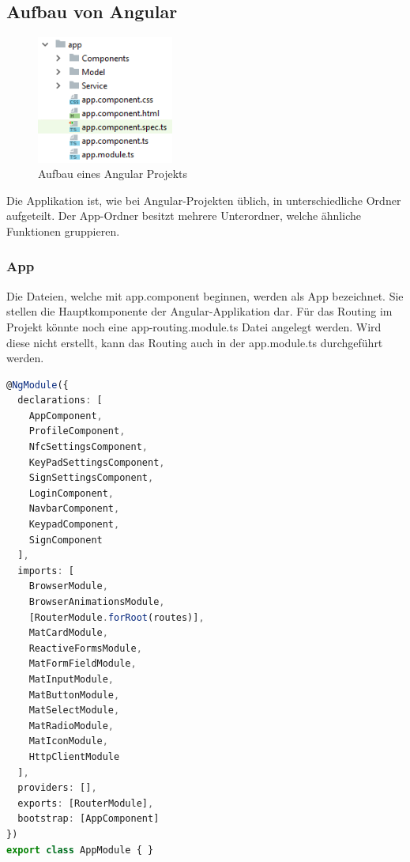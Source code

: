\subsection{Aufbau von Angular}

\begin{figure}[h]
    \centering
    \includegraphics[width=0.4\textwidth]{pics/Aufbau_Angular.png}
    \caption{Aufbau eines Angular Projekts}
    \end{figure}

Die Applikation ist, wie bei Angular-Projekten üblich, in unterschiedliche Ordner aufgeteilt. Der App-Ordner besitzt mehrere Unterordner, welche ähnliche Funktionen gruppieren.

\subsubsection{App}
Die Dateien, welche mit app.component beginnen, werden als App bezeichnet. Sie stellen die Hauptkomponente der Angular-Applikation dar. Für das Routing im Projekt könnte noch eine app-routing.module.ts Datei angelegt werden. Wird diese nicht erstellt, kann das Routing auch in der app.module.ts durchgeführt werden. 

\begin{lstlisting}[language=typescript, caption=app.module.ts]
    @NgModule({
  declarations: [
    AppComponent,
    ProfileComponent,
    NfcSettingsComponent,
    KeyPadSettingsComponent,
    SignSettingsComponent,
    LoginComponent,
    NavbarComponent,
    KeypadComponent,
    SignComponent
  ],
  imports: [
    BrowserModule,
    BrowserAnimationsModule,
    [RouterModule.forRoot(routes)],
    MatCardModule,
    ReactiveFormsModule,
    MatFormFieldModule,
    MatInputModule,
    MatButtonModule,
    MatSelectModule,
    MatRadioModule,
    MatIconModule,
    HttpClientModule
  ],
  providers: [],
  exports: [RouterModule],
  bootstrap: [AppComponent]
})
export class AppModule { }
\end{lstlisting}

